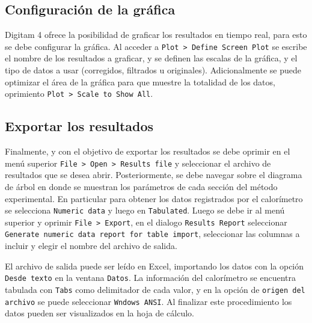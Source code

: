 	\subsection{Configuración de la gráfica}
	Digitam 4 ofrece la posibilidad de graficar los resultados en tiempo real, para esto se debe configurar la gr\'afica. Al acceder a \texttt{Plot > Define Screen Plot} se escribe el nombre de los resultados a graficar, y se definen las escalas de la gr\'afica, y el tipo de datos a usar (corregidos, filtrados u originales). Adicionalmente se puede optimizar el \'area de la gr\'afica para que muestre la totalidad de los datos, oprimiento \texttt{Plot > Scale to Show All}.
	
	\subsection{Exportar los resultados}
	Finalmente, y con el objetivo de exportar los resultados se debe oprimir en el men\'u superior \texttt{File > Open > Results file} y seleccionar el archivo de resultados que se desea abrir. Posteriormente, se debe navegar sobre el diagrama de \'arbol en donde se muestran los par\'ametros de cada secci\'on del m\'etodo experimental. En particular para obtener los datos registrados por el calor\'imetro se selecciona \texttt{Numeric data} y luego en \texttt{Tabulated}. Luego se debe ir al men\'u superior y oprimir \texttt{File > Export}, en el dialogo \texttt{Results Report} seleccionar \texttt{Generate numeric data report for table import}, seleccionar las columnas a incluir y elegir el nombre del archivo de salida.
	
	El archivo de salida puede ser le\'ido en Excel, importando los datos con la opci\'on \texttt{Desde texto} en la ventana \texttt{Datos}. La informaci\'on del calor\'imetro se encuentra tabulada con \texttt{Tabs} como delimitador de cada valor, y en la opci\'on de \texttt{origen del archivo} se puede seleccionar \texttt{Wndows ANSI}. Al finalizar este procedimiento los datos pueden ser visualizados en la hoja de c\'alculo.
	

